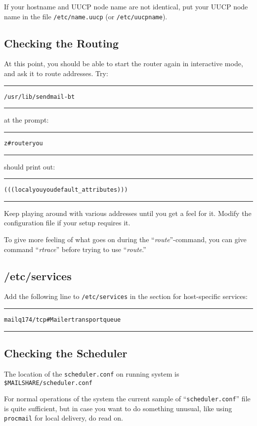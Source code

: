 If your hostname and UUCP node name are not identical, put your
UUCP node name in the file {\tt /etc/name.uucp} (or {\tt /etc/uucpname}).

\subsection{Checking the Routing}

At this point, you should be able to start the router again in
interactive mode, and ask it to route addresses.  Try:
\begin{alltt}\medskip\hrule\medskip
/usr/lib/sendmail -bt
\medskip\hrule\end{alltt}\medskip

at the prompt:
\begin{alltt}\medskip\hrule\medskip
z# router you
\medskip\hrule\end{alltt}\medskip

should print out:
\begin{alltt}\medskip\hrule\medskip
(((local you you default_attributes)))
\medskip\hrule\end{alltt}\medskip


Keep playing around with various addresses until you get a feel for it.
Modify the configuration file if your setup requires it.

To give more feeling of what goes on during the ``{\em route}''-command,
you can give command ``{\em rtrace}'' before trying to use ``{\em route}.''

\subsection{/etc/services}

Add the following line to {\tt /etc/services} in the section for
host-specific services:
\begin{alltt}\medskip\hrule\medskip
mailq   174/tcp  # Mailer transport queue
\medskip\hrule\end{alltt}

\subsection{Checking the Scheduler}

The location of the {\tt scheduler.conf} on running system is
{\tt \$MAILSHARE/scheduler.conf}

For normal operations of the system the current sample
of ``{\tt scheduler.conf}'' file
is quite sufficient, but in case you want to do something
unusual, like using {\tt procmail} for local delivery,
do read on.

